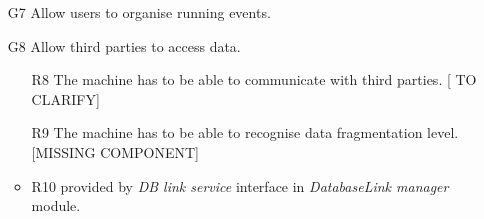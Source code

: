 \documentclass[DD.tex]{subfiles}
\begin{document}
\begin{itemize}
	\item [G7] Allow users to organise running events.
	
	\item [G8] Allow third parties to access data.
	\begin{itemize}
		\item [R8] The machine has to be able to communicate with 
		third parties. [	TO CLARIFY]
		\item [R9] The machine has to be able to recognise data 
		fragmentation level. [MISSING COMPONENT]
		\item R10 provided by \textit{DB link service} interface in \textit{DatabaseLink manager} module.
	\end{itemize}
	
\end{itemize}
\end{document}
